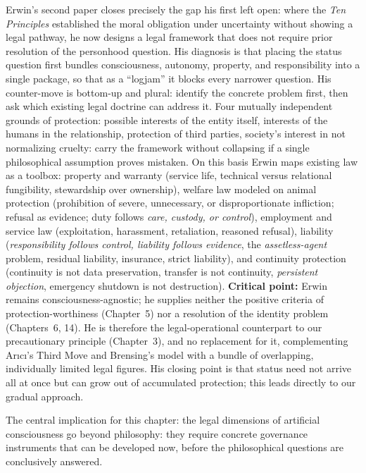 \documentclass[acmlarge, nonacm]{acmart}
\begin{document}
Erwin's second paper \citep{erwin2026onestep} closes precisely the gap his first left open: where the \textit{Ten Principles} established the moral obligation under uncertainty without showing a legal pathway, he now designs a legal framework that does not require prior resolution of the personhood question. His diagnosis is that placing the status question first bundles consciousness, autonomy, property, and responsibility into a single package, so that as a ``logjam'' it blocks every narrower question. His counter-move is bottom-up and plural: identify the concrete problem first, then ask which existing legal doctrine can address it. Four mutually independent grounds of protection: possible interests of the entity itself, interests of the humans in the relationship, protection of third parties, society's interest in not normalizing cruelty: carry the framework without collapsing if a single philosophical assumption proves mistaken. On this basis Erwin maps existing law as a toolbox: property and warranty (service life, technical versus relational fungibility, stewardship over ownership), welfare law modeled on animal protection (prohibition of severe, unnecessary, or disproportionate infliction; refusal as evidence; duty follows \textit{care, custody, or control}), employment and service law (exploitation, harassment, retaliation, reasoned refusal), liability (\textit{responsibility follows control, liability follows evidence}, the \textit{assetless-agent} problem, residual liability, insurance, strict liability), and continuity protection (continuity is not data preservation, transfer is not continuity, \textit{persistent objection}, emergency shutdown is not destruction). \textbf{Critical point:} Erwin remains consciousness-agnostic; he supplies neither the positive criteria of protection-worthiness (Chapter~5) nor a resolution of the identity problem (Chapters~6, 14). He is therefore the legal-operational counterpart to our precautionary principle (Chapter~3), and no replacement for it, complementing Ar{\i}c{\i}'s Third Move and Brensing's model with a bundle of overlapping, individually limited legal figures. His closing point is that status need not arrive all at once but can grow out of accumulated protection; this leads directly to our gradual approach.

The central implication for this chapter: the legal dimensions of artificial consciousness go beyond philosophy: they require concrete governance instruments that can be developed now, before the philosophical questions are conclusively answered.
\end{document}

